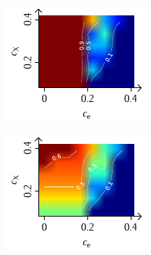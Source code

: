 \documentclass[a4paper, 10pt, twoside, openany]{book} %
\begin{document}
\begin{figure}[b]
    \bigskip

    \begin{minipage}[t]{0.31\textwidth}
        \includegraphics[width=\textwidth]{Abbildungen/Phasendiagramme/Exakt/F_G.pdf}
        \label{FGx}
    \end{minipage}
    \hfill
    \begin{minipage}[t]{0.31\textwidth}
        \includegraphics[width=\textwidth]{Abbildungen/Phasendiagramme/Exakt/F_K.pdf}
        \label{FKx}

\end{minipage}
\end{figure}
\end{document}
